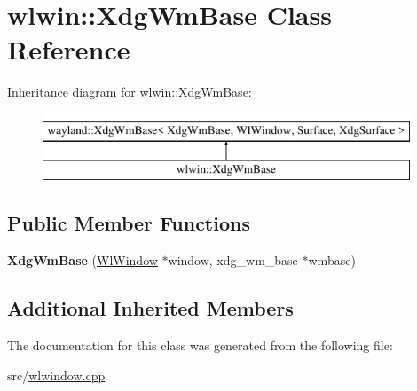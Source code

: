 \hypertarget{classwlwin_1_1XdgWmBase}{}\section{wlwin\+::Xdg\+Wm\+Base Class Reference}
\label{classwlwin_1_1XdgWmBase}
Inheritance diagram for wlwin\+::Xdg\+Wm\+Base\+:\begin{figure}[H]
\begin{center}
\leavevmode
\includegraphics[height=2.000000cm]{classwlwin_1_1XdgWmBase}
\end{center}
\end{figure}
\subsection*{Public Member Functions}
\begin{DoxyCompactItemize}
\item 
\mbox{\label{classwlwin_1_1XdgWmBase_abbc08360622a07a5f5c70362eaa31a35}} 
{\bfseries Xdg\+Wm\+Base} (\mbox{\hyperlink{classwlwin_1_1WlWindow}{Wl\+Window}} $\ast$window, xdg\+\_\+wm\+\_\+base $\ast$wmbase)
\end{DoxyCompactItemize}
\subsection*{Additional Inherited Members}


The documentation for this class was generated from the following file\+:\begin{DoxyCompactItemize}
\item 
src/\mbox{\hyperlink{wlwindow_8cpp}{wlwindow.\+cpp}}\end{DoxyCompactItemize}

